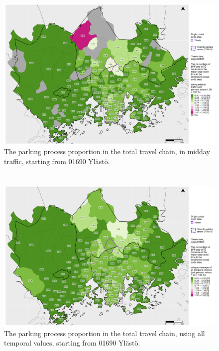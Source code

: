 \begin{figure}
    \section{}
    \centering
    \includegraphics[trim={0.9cm 0.3cm 0.25cm 0.3cm},clip,width=\textwidth]{images/compare_traveltimes_mapfill-msc_m_pct_fromzip-01690_16-10-2020.png}
    \caption[Parking process proportion from Ylästö, midday traffic]{The parking process proportion in the total travel chain, in midday traffic, starting from 01690 Ylästö.}%
    \label{fig:compare_msc_m_pct_01690}%
\end{figure}

\begin{figure}
    \section{}
    \centering
    \includegraphics[trim={0.9cm 0.3cm 0.25cm 0.3cm},clip,width=\textwidth]{images/compare_traveltimes_mapfill-msc_all_pct_fromzip-01690_16-10-2020.png}
    \caption[Parking process proportion from Ylästö, all temporal values]{The parking process proportion in the total travel chain, using all temporal values, starting from 01690 Ylästö.}%
    \label{fig:compare_msc_all_pct_01690}%
\end{figure}
\restoregeometry